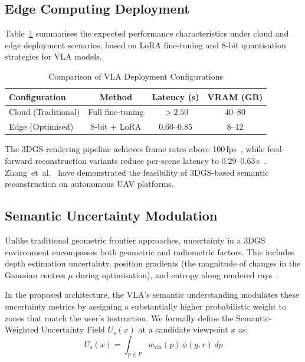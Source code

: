 \documentclass[conference]{IEEEtran}
\begin{document}
\subsection{Edge Computing Deployment}
\label{subsec:edge}

Table~\ref{tab:edge_comparison} summarises the expected performance characteristics under cloud and edge deployment scenarios, based on LoRA fine-tuning and 8-bit quantisation strategies for VLA models.

\begin{table}[htbp]
\caption{Comparison of VLA Deployment Configurations}
\label{tab:edge_comparison}
\begin{center}
\begin{tabular}{lccc}
\toprule
\textbf{Configuration} & \textbf{Method} & \textbf{Latency (s)} & \textbf{VRAM (GB)} \\
\midrule
Cloud (Traditional) & Full fine-tuning & $> 2.50$ & $40$--$80$ \\
Edge (Optimised)    & 8-bit + LoRA     & $0.60$--$0.85$ & $8$--$12$ \\
\bottomrule
\end{tabular}
\end{center}
\end{table}

The 3DGS rendering pipeline achieves frame rates above 100\,fps~\cite{li2025drivingforward}, while feed-forward reconstruction variants reduce per-scene latency to 0.29--0.63\,s~\cite{li2025drivingforward}.
Zhang~et~al.~\cite{zhang2025autonomous} have demonstrated the feasibility of 3DGS-based semantic reconstruction on autonomous UAV platforms.

\subsection{Semantic Uncertainty Modulation}
\label{subsec:uncertainty}

Unlike traditional geometric frontier approaches, uncertainty in a 3DGS environment encompasses both geometric and radiometric factors.
This includes depth estimation uncertainty, position gradients (the magnitude of changes in the Gaussian centres $\mu$ during optimisation), and entropy along rendered rays~\cite{liu2025survey3dgs}.

In the proposed architecture, the VLA's semantic understanding modulates these uncertainty metrics by assigning a substantially higher probabilistic weight to zones that match the user's instruction. We formally define the Semantic-Weighted Uncertainty Field $U_s(x)$ at a candidate viewpoint $x$ as:
\begin{equation}
	U_s(x) = \int_{p \in P} w_{\text{vla}}(p)\,\phi(g,r)\, dp
\end{equation}
\end{document}
